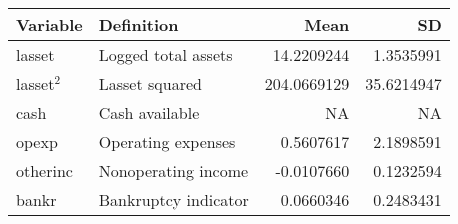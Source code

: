 \begin{table}
\centering
\begin{tabular}[t]{llrr}
\toprule
Variable & Definition & Mean & SD\\
\midrule
lasset & Logged total assets & 14.2209244 & 1.3535991\\
lasset$^{2}$ & Lasset squared & 204.0669129 & 35.6214947\\
cash & Cash available & NA & NA\\
opexp & Operating expenses & 0.5607617 & 2.1898591\\
otherinc & Nonoperating income & -0.0107660 & 0.1232594\\
\addlinespace
bankr & Bankruptcy indicator & 0.0660346 & 0.2483431\\
\bottomrule
\end{tabular}
\end{table}